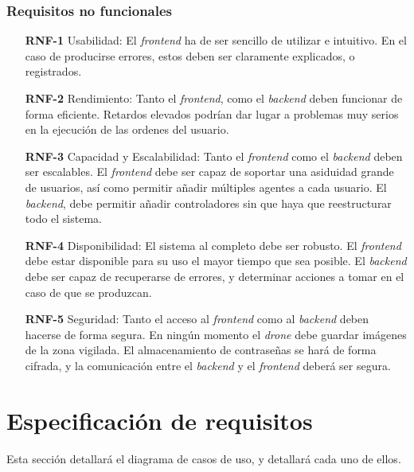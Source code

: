 \subsubsection{Requisitos no funcionales}
\begin{itemize}
\item[\textbf{RNF-1}] Usabilidad: El \emph{frontend} ha de ser sencillo de utilizar e intuitivo. En el caso de producirse errores, estos deben ser claramente explicados, o registrados.
\item[\textbf{RNF-2}] Rendimiento: Tanto el \emph{frontend}, como el \emph{backend} deben funcionar de forma eficiente. Retardos elevados podrían dar lugar a problemas muy serios en la ejecución de las ordenes del usuario.
\item[\textbf{RNF-3}] Capacidad y Escalabilidad: Tanto el \emph{frontend} como el \emph{backend} deben ser escalables. El \emph{frontend} debe ser capaz de soportar una asiduidad grande de usuarios, así como permitir añadir múltiples agentes a cada usuario. El \emph{backend}, debe permitir añadir controladores sin que haya que reestructurar todo el sistema.
\item[\textbf{RNF-4}] Disponibilidad: El sistema al completo debe ser robusto. El \emph{frontend} debe estar disponible para su uso el mayor tiempo que sea posible. El \emph{backend} debe ser capaz de recuperarse de errores, y determinar acciones a tomar en el caso de que se produzcan.
\item[\textbf{RNF-5}] Seguridad: Tanto el acceso al \emph{frontend} como al \emph{backend} deben hacerse de forma segura. En ningún momento el \emph{drone} debe guardar imágenes de la zona vigilada. El almacenamiento de contraseñas se hará de forma cifrada, y la comunicación entre el \emph{backend} y el \emph{frontend} deberá ser segura.
\end{itemize}

\section{Especificación de requisitos}

Esta sección detallará el diagrama de casos de uso, y detallará cada uno de ellos. 





